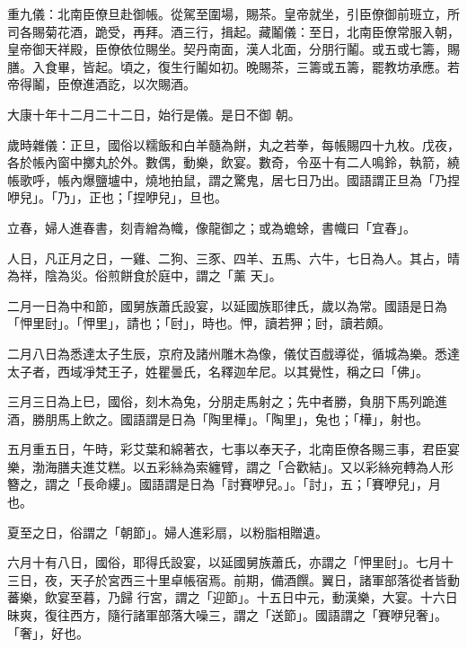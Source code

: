 \begin{pinyinscope}
 重九儀：北南臣僚旦赴御帳。從駕至圍場，賜茶。皇帝就坐，引臣僚御前班立，所司各賜菊花酒，跪受，再拜。酒三行，揖起。藏鬮儀：至日，北南臣僚常服入朝，皇帝御天祥殿，臣僚依位賜坐。契丹南面，漢人北面，分朋行鬮。或五或七籌，賜膳。入食畢，皆起。頃之，復生行鬮如初。晚賜茶，三籌或五籌，罷教坊承應。若帝得鬮，臣僚進酒訖，以次賜酒。



 大康十年十二月二十二日，始行是儀。是日不御
 朝。



 歲時雜儀：正旦，國俗以糯飯和白羊髓為餅，丸之若拳，每帳賜四十九枚。戊夜，各於帳內窗中擲丸於外。數偶，動樂，飲宴。數奇，令巫十有二人鳴鈴，執箭，繞帳歌呼，帳內爆鹽壚中，燒地拍鼠，謂之驚鬼，居七日乃出。國語謂正旦為「乃捏咿兒」。「乃」，正也；「捏咿兒」，旦也。



 立春，婦人進春書，刻青繒為幟，像龍御之；或為蟾蜍，書幟曰「宜春」。



 人日，凡正月之日，一雞、二狗、三豕、四羊、五馬、六牛，七日為人。其占，晴為祥，陰為災。俗煎餅食於庭中，謂之「薰
 天」。



 二月一日為中和節，國舅族蕭氏設宴，以延國族耶律氏，歲以為常。國語是日為「𢘉里尀」。「𢘉里」，請也；「尀」，時也。𢘉，讀若狎；尀，讀若頗。



 二月八日為悉達太子生辰，京府及諸州雕木為像，儀仗百戲導從，循城為樂。悉達太子者，西域凈梵王子，姓瞿曇氏，名釋迦牟尼。以其覺性，稱之曰「佛」。



 三月三日為上巳，國俗，刻木為兔，分朋走馬射之；先中者勝，負朋下馬列跪進酒，勝朋馬上飲之。國語謂是日為「陶里樺」。「陶里」，兔也；「樺」，射也。



 五月重五日，午時，彩艾葉和綿著衣，七事以奉天子，北南臣僚各賜三事，君臣宴樂，渤海膳夫進艾糕。以五彩絲為索纏臂，謂之「合歡結」。又以彩絲宛轉為人形簪之，謂之「長命縷」。國語謂是日為「討賽咿兒。」。「討」，五；「賽咿兒」，月也。



 夏至之日，俗謂之「朝節」。婦人進彩扇，以粉脂相贈遺。



 六月十有八日，國俗，耶得氏設宴，以延國舅族蕭氏，亦謂之「𢘉里尀」。七月十三日，夜，天子於宮西三十里卓帳宿焉。前期，備酒饌。翼日，諸軍部落從者皆動蕃樂，飲宴至暮，乃歸
 行宮，謂之「迎節」。十五日中元，動漢樂，大宴。十六日昧爽，復往西方，隨行諸軍部落大噪三，謂之「送節」。國語謂之「賽咿兒奢」。「奢」，好也。




\end{pinyinscope}

